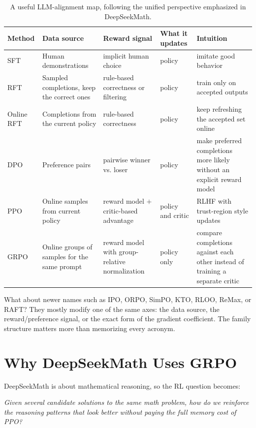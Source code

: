 \documentclass[11pt]{article}
\begin{document}
  \begin{table}[t]
  \centering
  \small
  \begin{tabularx}{\linewidth}{@{}lYYYY@{}}
  \toprule
  Method & Data source & Reward signal & What it updates & Intuition \\
  \midrule
  SFT & Human demonstrations & implicit human choice & policy & imitate good behavior \\
  RFT & Sampled completions, keep the correct ones & rule-based correctness or filtering & policy & train only on accepted outputs \\
  Online RFT & Completions from the current policy & rule-based correctness & policy & keep refreshing the accepted set online \\
  DPO & Preference pairs & pairwise winner vs. loser & policy & make preferred completions more likely without an explicit reward model \\
  PPO & Online samples from current policy & reward model $+$ critic-based advantage & policy and critic & RLHF with trust-region style updates \\
  GRPO & Online groups of samples for the same prompt & reward model with group-relative normalization & policy only & compare completions against each other instead of training a separate critic \\
  \bottomrule
  \end{tabularx}
  \caption{A useful LLM-alignment map, following the unified perspective emphasized in DeepSeekMath.}
  \end{table}

  What about newer names such as IPO, ORPO, SimPO, KTO, RLOO, ReMax, or RAFT? They mostly modify one of the same axes: the data source, the reward/preference signal, or the exact form of the gradient coefficient. The family structure matters more than memorizing every acronym.

  \section{Why DeepSeekMath Uses GRPO}

  DeepSeekMath is about mathematical reasoning, so the RL question becomes:

  \begin{center}
  \emph{Given several candidate solutions to the same math problem, how do we reinforce the reasoning patterns that look better without paying the full memory cost of PPO?}
  \end{center}
\end{document}

